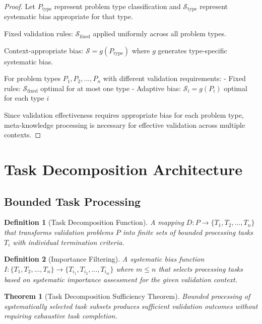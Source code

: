 \documentclass[12pt,a4paper]{article}
\newtheorem{theorem}{Theorem}
\newtheorem{definition}{Definition}
\begin{document}
\begin{proof}
Let $P_{\text{type}}$ represent problem type classification and $\mathcal{S}_{\text{type}}$ represent systematic bias appropriate for that type.

Fixed validation rules: $\mathcal{S}_{\text{fixed}}$ applied uniformly across all problem types.

Context-appropriate bias: $\mathcal{S} = g(P_{\text{type}})$ where $g$ generates type-specific systematic bias.

For problem types $P_1, P_2, ..., P_n$ with different validation requirements:
- Fixed rules: $\mathcal{S}_{\text{fixed}}$ optimal for at most one type
- Adaptive bias: $\mathcal{S}_i = g(P_i)$ optimal for each type $i$

Since validation effectiveness requires appropriate bias for each problem type, meta-knowledge processing is necessary for effective validation across multiple contexts.
\end{proof}

\section{Task Decomposition Architecture}

\subsection{Bounded Task Processing}

\begin{definition}[Task Decomposition Function]
A mapping $D: P \to \{T_1, T_2, ..., T_n\}$ that transforms validation problems $P$ into finite sets of bounded processing tasks $T_i$ with individual termination criteria.
\end{definition}

\begin{definition}[Importance Filtering]
A systematic bias function $I: \{T_1, T_2, ..., T_n\} \to \{T_{i_1}, T_{i_2}, ..., T_{i_m}\}$ where $m \leq n$ that selects processing tasks based on systematic importance assessment for the given validation context.
\end{definition}

\begin{theorem}[Task Decomposition Sufficiency Theorem]
Bounded processing of systematically selected task subsets produces sufficient validation outcomes without requiring exhaustive task completion.
\end{theorem}
\end{document}
